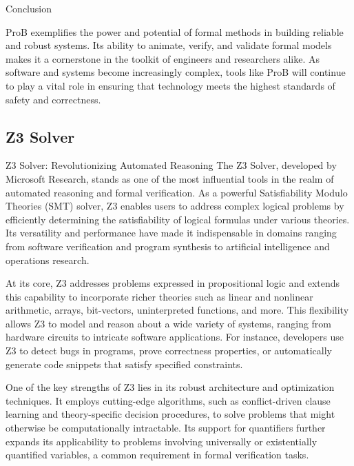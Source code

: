 Conclusion

ProB exemplifies the power and potential of formal methods in building reliable and robust systems. Its ability to animate, verify, and validate formal models makes it a cornerstone in the toolkit of engineers and researchers alike. As software and systems become increasingly complex, tools like ProB will continue to play a vital role in ensuring that technology meets the highest standards of safety and correctness.





\subsection{Z3 Solver}
\cite{10.1007/978-3-031-65627-9_2} \cite{10.1007/978-3-540-78800-3_24}




Z3 Solver: Revolutionizing Automated Reasoning
The Z3 Solver, developed by Microsoft Research, stands as one of the most influential tools in the realm of automated reasoning and formal verification. As a powerful Satisfiability Modulo Theories (SMT) solver, Z3 enables users to address complex logical problems by efficiently determining the satisfiability of logical formulas under various theories. Its versatility and performance have made it indispensable in domains ranging from software verification and program synthesis to artificial intelligence and operations research.

At its core, Z3 addresses problems expressed in propositional logic and extends this capability to incorporate richer theories such as linear and nonlinear arithmetic, arrays, bit-vectors, uninterpreted functions, and more. This flexibility allows Z3 to model and reason about a wide variety of systems, ranging from hardware circuits to intricate software applications. For instance, developers use Z3 to detect bugs in programs, prove correctness properties, or automatically generate code snippets that satisfy specified constraints.

One of the key strengths of Z3 lies in its robust architecture and optimization techniques. It employs cutting-edge algorithms, such as conflict-driven clause learning and theory-specific decision procedures, to solve problems that might otherwise be computationally intractable. Its support for quantifiers further expands its applicability to problems involving universally or existentially quantified variables, a common requirement in formal verification tasks.


